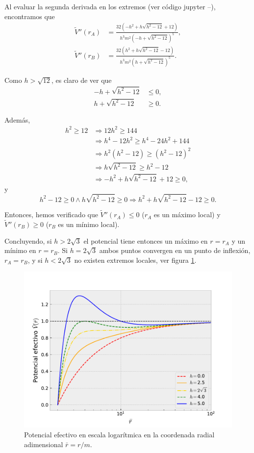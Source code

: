 \documentclass[letterpaper,11pt]{article}
\begin{document}
Al evaluar la segunda derivada en los extremos (ver código jupyter --), encontramos que 
\begin{align}
\tilde{V}''(r_A) &= \frac{32(-h^2 + h\sqrt{h^2-12} + 12)}{h^3m^2(-h + \sqrt{h^2-12})^5}, \\
\tilde{V}''(r_B) &= \frac{32(h^2 + h\sqrt{h^2-12} - 12)}{h^3m^2(h + \sqrt{h^2-12})^5}.
\end{align}

Como $h > \sqrt{12}$, es claro de ver que
\begin{align}
- h + \sqrt{h^2-12} &\leq 0, \\
h + \sqrt{h^2-12} &\geq 0. 
\end{align}

Además, 
\begin{align}
h^2 \geq 12 &\Rightarrow 12h^2 \geq 144 \\
&\Rightarrow h^4 - 12h^2 \geq h^4 - 24h^2+144 \\
&\Rightarrow h^2(h^2-12) \geq (h^2-12)^2 \\
&\Rightarrow h\sqrt{h^2-12} \geq h^2-12 \\
&\Rightarrow -h^2 + h\sqrt{h^2-12} + 12 \geq 0,
\end{align}
y
\begin{equation}
h^2-12 \geq 0 \wedge h\sqrt{h^2-12} \geq 0 \Rightarrow h^2 + h\sqrt{h^2-12} - 12 \geq 0.
\end{equation}

Entonces, hemos verificado que $\tilde{V}''(r_A) \leq 0$ ($r_A$ es un máximo local) y $\tilde{V}''(r_B) \geq 0$ ($r_B$ es un mínimo local).

Concluyendo, si $h > 2\sqrt{3}$ el potencial tiene entonces un máximo en $r = r_A$ y un mínimo en $r = r_B$. Si $h = 2\sqrt{3}$ ambos puntos convergen en un punto de inflexión, $r_A = r_B$, y si $h < 2\sqrt{3}$ no existen extremos locales, ver figura \ref{fig:Effective-Potential}.

\begin{figure}[H] 
    \centering
    \includegraphics[scale = 0.7]{Potencial_Efectivo.pdf}
    \caption{Potencial efectivo en escala logarítmica en la coordenada radial adimensional $\bar{r} = r/m$.}
    \label{fig:Effective-Potential}
\end{figure}
\end{document}
